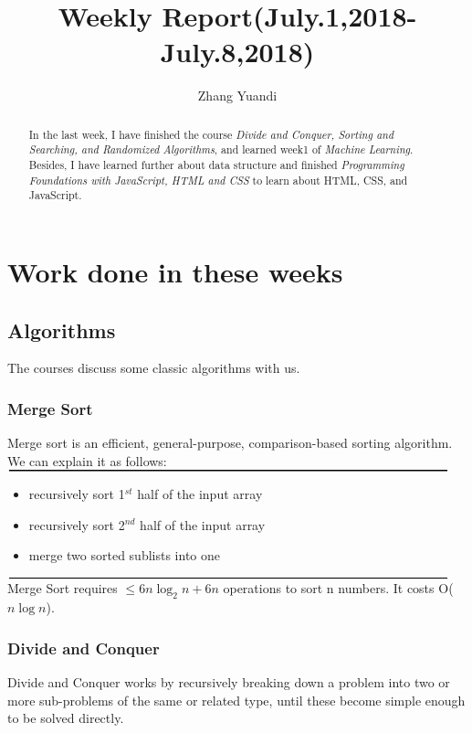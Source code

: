 \documentclass{article}
\title{Weekly Report(July.1,2018-July.8,2018)}
\author{Zhang Yuandi}
\begin{document}
\maketitle

\begin{abstract}
In the last week, I have finished the course \emph{Divide and Conquer, Sorting and Searching, and Randomized Algorithms}, and learned week1 of \emph{Machine Learning}. Besides, I have learned further about data structure and finished \emph{Programming Foundations with JavaScript, HTML and CSS} to learn about HTML, CSS, and JavaScript.

\end{abstract}
\section{Work done in these weeks}
\subsection{Algorithms}
The courses discuss some classic algorithms with us.

\subsubsection{Merge Sort}
Merge sort is an efficient, general-purpose, comparison-based sorting algorithm. We can explain it as follows:\\
$\rule{\textwidth}{0.3mm}$
\begin{itemize}
  \item recursively sort 1$^{st}$ half of the input array
  \item recursively sort 2$^{nd}$ half of the input array
  \item merge two sorted sublists into one
\end{itemize}
$\rule{\textwidth}{0.3mm}$
Merge Sort requires $\leq 6n\log_2n + 6n$ operations to sort n numbers. It costs O($n \log n$).

\subsubsection{Divide and Conquer}
Divide and Conquer works by recursively breaking down a problem into two or more sub-problems of the same or related type, until these become simple enough to be solved directly.
\end{document}
